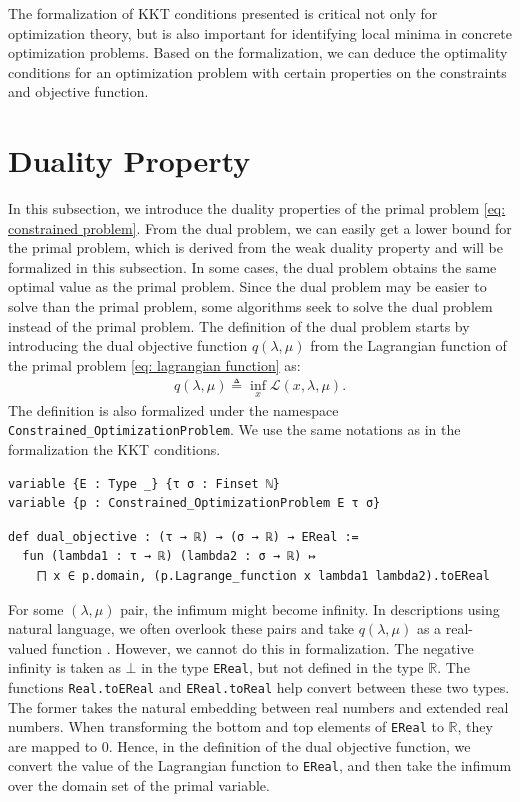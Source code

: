 \documentclass[sn-mathphys]{JORSC-jnl}%
\theoremstyle{thmstyleone}%
\theoremstyle{thmstylethree}%
\newcommand{\lean}[1]{\lstinline[language=lean, mathescape=true]{#1}}
\begin{document}
The formalization of KKT conditions presented is critical not only for optimization theory, but is also important for identifying local minima in concrete optimization problems. Based on the formalization, we can deduce the optimality conditions for an optimization problem with certain properties on the constraints and objective function.

\section{Duality Property}\label{sec: weak duality}
In this subsection, we introduce the duality properties of the primal problem \eqref{eq: constrained problem}. From the dual problem, we can easily get a lower bound for the primal problem, which is derived from the weak duality property and will be formalized in this subsection. In some cases, the dual problem obtains the same optimal value as the primal problem. Since the dual problem may be easier to solve than the primal problem, some algorithms seek to solve the dual problem instead of the primal problem. The definition of the dual problem starts by introducing the dual objective function $q(\lambda, \mu)$ from the Lagrangian function of the primal problem \eqref{eq: lagrangian function} as:
\begin{align*}
    q(\lambda, \mu) \triangleq \inf\limits_x \mathcal{L}(x, \lambda, \mu).
\end{align*}
The definition is also formalized under the namespace \lean{Constrained_OptimizationProblem}. We use the same notations as in the formalization the KKT conditions. 
\begin{lstlisting}
variable {E : Type _} {τ σ : Finset ℕ}
variable {p : Constrained_OptimizationProblem E τ σ}
\end{lstlisting}
\vspace{0.3cm}
\begin{lstlisting}
def dual_objective : (τ → ℝ) → (σ → ℝ) → EReal :=
  fun (lambda1 : τ → ℝ) (lambda2 : σ → ℝ) ↦
    ⨅ x ∈ p.domain, (p.Lagrange_function x lambda1 lambda2).toEReal
\end{lstlisting}
For some $(\lambda, \mu)$ pair, the infimum might become infinity. In descriptions using natural language, we often overlook these pairs and take $q(\lambda, \mu)$ as a real-valued function \cite{nocedal1999numerical}. However, we cannot do this in formalization. The negative infinity is taken as $\bot$ in the type \lean{EReal}, but not defined in the type $\mathbb{R}$. The functions \lean{Real.toEReal} and \lean{EReal.toReal} help convert between these two types. The former takes the natural embedding between real numbers and extended real numbers. When transforming the bottom and top elements of \lean{EReal} to $\mathbb{R}$, they are mapped to $0$. Hence, in the definition of the dual objective function, we convert the value of the Lagrangian function to \lean{EReal}, and then take the infimum over the domain set of the primal variable. 
\end{document}
